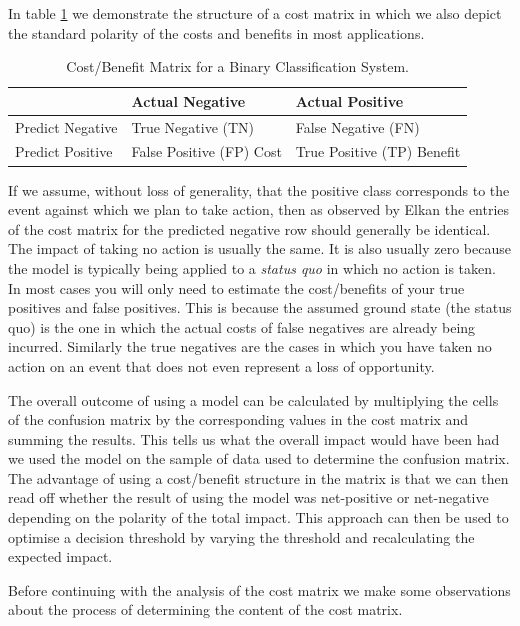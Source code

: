 \documentclass[12pt,a4paper]{article}
\numberwithin{equation}{section}
\begin{document}
In table \ref{costmatrix} we demonstrate the structure of a cost matrix in which we also depict the standard polarity of the costs and 
benefits in most applications.

\begin{table}[htbp]
\centering
 \caption{Cost/Benefit Matrix for a Binary Classification System.}
 \label{costmatrix}
  \begin{tabular}{|l||l|l|}
   \toprule
                          &Actual Negative              &Actual Positive       \\
   \midrule
   Predict Negative       &True Negative (TN)           &False Negative (FN)           \\
   Predict Positive       &False Positive (FP) Cost     &True Positive (TP) Benefit    \\
   \bottomrule
  \end{tabular}
\end{table}

If we assume, without loss of generality, that the positive class corresponds to the event against which we
plan to take action, then as observed by Elkan \cite{Elkan2001} the entries of the cost matrix for the predicted
negative row should generally be identical. The impact of taking no action
is usually the same. It is also usually zero because the model is typically being applied
to a \textit{status quo} in which no action is taken.
In most cases you will only need to estimate the cost/benefits of your true positives
and false positives. This is because the assumed ground state (the status quo) is the
one in which the actual costs of false negatives are already being incurred. Similarly
the true negatives are the cases in which you have taken no action on an event that
does not even represent a loss of opportunity.

The overall outcome of using a model can be calculated by multiplying the cells of the confusion matrix by the corresponding
values in the cost matrix and summing the results. This tells us what the overall impact would have been had we used the model
on the sample of data used to determine the confusion matrix. The advantage of using a cost/benefit structure in the matrix is
that we can then read off whether the result of using the model was net-positive or net-negative depending on the polarity of
the total impact. This approach can then be used to optimise a decision threshold
by varying the threshold and recalculating the expected impact.

Before continuing with the analysis of the cost matrix we make some observations about the process of determining the content
of the cost matrix.
\end{document}
